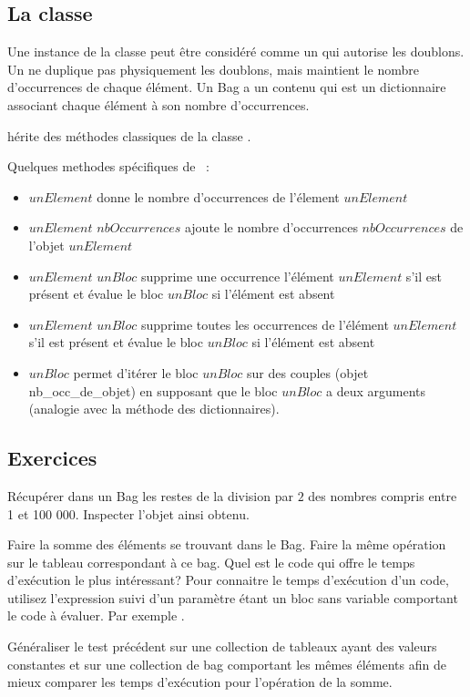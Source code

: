 \subsection{La classe }
Une instance de la classe  peut \^etre consid\'er\'e comme un  qui autorise les doublons. Un  ne duplique pas physiquement les doublons, mais maintient le nombre d'occurrences de chaque \'el\'ement. Un Bag a un contenu qui est un dictionnaire associant  chaque \'el\'ement  \`a son nombre d'occurrences.

 h\'erite des m\'ethodes classiques de la classe .

Quelques methodes sp\'ecifiques de ~:
\begin{itemize}
\item
{}$unElement$ donne le nombre d'occurrences de
l'\'element $unElement$ 
\item
{}$unElement$ $nbOccurrences$ ajoute le nombre d'occurrences $nbOccurrences$ de l'objet $unElement$
\item
{}$unElement$ $unBloc$ supprime une occurrence
l'\'el\'ement $unElement$ s'il est pr\'esent  et 
\'evalue le bloc $unBloc$ si l'\'el\'ement est absent
\item
{}$unElement$ $unBloc$ supprime
toutes les occurrences de l'\'el\'ement $unElement$ s'il est pr\'esent  et
\'evalue le bloc $unBloc$ si l'\'el\'ement est absent
\item
{}$unBloc$ permet d'it\'erer le bloc $unBloc$ sur des
couples (objet nb\_occ\_de\_objet) en supposant que le bloc $unBloc$ a deux arguments (analogie avec la m\'ethode  des dictionnaires).
\end{itemize}

\subsection*{Exercices}
\begin{itemize}
\exoitem
R\'ecup\'erer dans un Bag les restes de la division par $2$ des nombres compris entre 1 et 100 000. Inspecter l'objet ainsi obtenu.

\exoitem Faire la somme des \'el\'ements se trouvant dans le Bag. Faire la m\^eme op\'eration sur le tableau correspondant \`a ce bag. Quel est le code qui offre le temps d'ex\'ecution le plus int\'eressant? Pour connaitre le temps d'ex\'ecution d'un code, utilisez l'expression  suivi d'un param\`etre \'etant un bloc sans variable comportant le code \`a \'evaluer. Par exemple .

\exoitem G\'en\'eraliser  le test pr\'ec\'edent sur une collection de tableaux ayant des valeurs constantes et sur une collection de bag comportant les m\^emes \'el\'ements afin de mieux comparer les temps d'ex\'ecution pour l'op\'eration de la somme.
\end{itemize}



